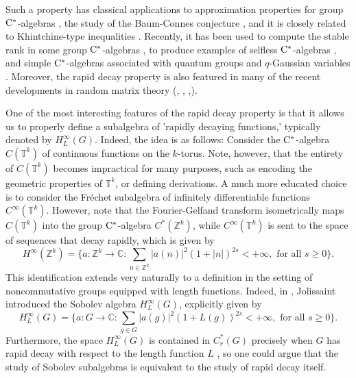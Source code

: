\documentclass[11pt]{article}
\theoremstyle{definition}
\theoremstyle{remark}
\numberwithin{equation}{section}
\numberwithin{equation}{section}
\def\Z{\mathbb{Z}}
\def\Z{\mathbb Z}
\def\CC{\mathbb C}
\numberwithin{equation}{section}
\begin{document}
Such a property has classical applications to approximation properties for group ${\rm C}^*$-algebras \cite{Ha78}, the study of the Baum-Connes conjecture \cite{La02}, and it is closely related to Khintchine-type inequalities \cite{RiXu06}. Recently, it has been used to compute the stable rank in some group ${\rm C}^*$-algebras \cite{DydlH99,GeOs20}, to produce examples of selfless ${\rm C}^*$-algebras \cite{AGKEP25,KEPT25,HKER25}, and simple ${\rm C}^*$-algebras associated with quantum groups \cite{VaVe07} and $q$-Gaussian variables \cite{AmJeWa26}. Moreover, the rapid decay property is also featured in many of the recent developments in random matrix theory (\cite[Section 7.1]{bordenave2024normmatrixvaluedpolynomialsrandom}, \cite[Appendix B]{NewApproachII}, \cite[Sections 5 and 6]{MdLS},\cite[Section 2.6]{vanhandel2026strongconvergencephenomenon}).



One of the most interesting features of the rapid decay property is that it allows us to properly define a subalgebra of 'rapidly decaying functions,' typically denoted by $H^\infty_L(G)$. Indeed, the idea is as follows: Consider the ${\rm C}^*$-algebra $C(\mathbb T^k)$ of continuous functions on the $k$-torus. Note, however, that the entirety of $C(\mathbb T^k)$ becomes impractical for many purposes, such as encoding the geometric properties of $\mathbb T^k$, or defining derivations. A much more educated choice is to consider the Fr\'echet subalgebra of infinitely differentiable functions $C^\infty(\mathbb T^k)$. However, note that the Fourier-Gelfand transform isometrically maps $C(\mathbb T^k)$ into the group ${\rm C}^*$-algebra $C^*(\Z^k)$, while $C^\infty(\mathbb T^k)$ is sent to the space of sequences that decay rapidly, which is given by
$$
H^\infty(\Z^k)=\{a:\Z^k\to\CC: \sum_{n\in\Z^k} |a(n)|^{2}(1+|n|)^{2s}<+\infty, \text{ for all }s\geq0 \}.
$$
This identification extends very naturally to a definition in the setting of noncommutative groups equipped with length functions. Indeed, in \cite[Definition 1.1.6]{Jo90}, Jolissaint introduced the Sobolev algebra $H^\infty_L(G)$, explicitly given by 
$$
H^\infty_L(G)=\{a:G\to\CC: \sum_{g\in G} |a(g)|^{2}(1+L(g))^{2s}<+\infty, \text{ for all }s\geq0 \}.
$$
Furthermore, the space $H^\infty_L(G)$ is contained in $C^*_r(G)$ precisely when $G$ has rapid decay with respect to the length function $L$ \cite[Definition 1.2.1, Proposition 1.2.6]{Jo90}, so one could argue that the study of Sobolev subalgebras is equivalent to the study of rapid decay itself.
\end{document}
